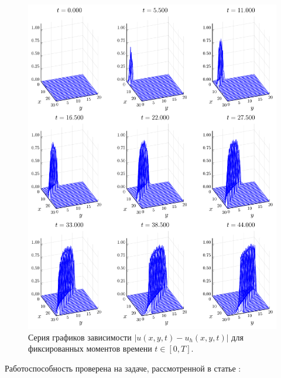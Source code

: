 \begin{figure}
    \centering
    \includegraphics[width=\textwidth, keepaspectratio]{Разностные_схемы_на_статических_сетках/Программный_код_примеры_расчётов/explicit_scheme/problem_3_loc_err_wireframe.pdf}
    \caption{Серия графиков зависимости $|u(x, y, t) - u_h(x, y, t)|$ для фиксированных моментов времени $t \in [0, T]$.}
    \label{fig:problem_3_err}
\end{figure}
Работоспособность проверена на задаче, рассмотренной в статье \cite{самарский1963примеры}:
